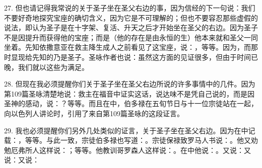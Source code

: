 27. 但也请记得我常说的关于圣子坐在圣父右边的事，因为信经的下一句说：我们不要好奇地探究宝座的确切含义，因为它是不可理解的；但也不要容忍那些虚假的说法，即认为圣子是在十字架、复活、升天之后才开始坐在圣父的右边。因为圣子不是因提升而获得他的宝座；而是（他的存在是由永恒的生）他本来就和圣父一同坐着。先知依撒意亚在救主降生成人之前看见了这宝座，说：，等等。因为，而那时显现给先知的乃是圣子。圣咏作者也说：虽然这方面的见证很多，但由于时间已晚，我们就以这些为满足。\par

28. 但现在我必须提醒你们关于圣子坐在圣父右边所说的许多事情中的几件。因为第109篇圣咏清楚地说：救主在福音中证实这话，说达味不是凭自己说的，而是因圣神的感动，说：？等等。而且在中，伯多禄在五旬节日与十一位宗徒站在一起，向以色列人讲论时，引用了来自第109篇圣咏的这段证言。\par

29. 我也必须提醒你们另外几处类似的证言，关于圣子坐在圣父右边。因为在中记载：，等等。与此一致，宗徒伯多禄也写道：。宗徒保禄致罗马人书说：。他又劝勉厄弗所人这样说：；等等。他教训哥罗森人这样说：。在中他说：。又说：又说：又说：\par


